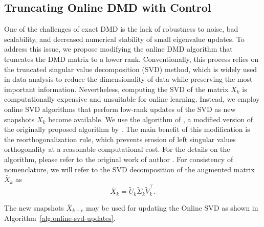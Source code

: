 \subsection{Truncating Online DMD with Control}\label{sec:truncating-online-dmd}
One of the challenges of exact DMD is the lack of robustness to noise, bad scalability, and decreased numerical stability of small eigenvalue updates. To address this issue, we propose modifying the online DMD algorithm that truncates the DMD matrix to a lower rank. Conventionally, this process relies on the truncated singular value decomposition (SVD) method, which is widely used in data analysis to reduce the dimensionality of data while preserving the most important information. Nevertheless, computing the SVD of the matrix \(X_k\) is computationally expensive and unsuitable for online learning. Instead, we employ online SVD algorithms that perform low-rank updates of the SVD as new snapshots \(X_k\) become available. We use the algorithm of \citet{Zhang2022}, a modified version of the originally proposed algorithm by \citet{Brand2006}. The main benefit of this modification is the reorthogonalization rule, which prevents erosion of left singular values orthogonality at a reasonable computational cost. For the details on the algorithm, please refer to the original work of author \citep{Zhang2022}. For consistency of nomenclature, we will refer to the SVD decomposition of the augmented matrix \(\bar{X}_k\) as
\begin{equation*}
	\bar{X}_k = \tilde{U}_k \tilde{\Sigma}_k \tilde{V}_k^\top.
\end{equation*}

The new snapshots \(\bar{X}_{k+c}\) may be used for updating the Online SVD as shown in Algorithm~\ref{alg:online-svd-updates}.

